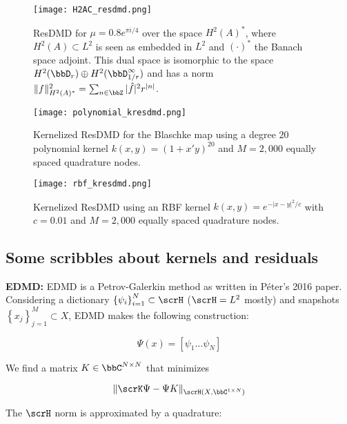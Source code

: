 \begin{figure}
    \texttt{[image: H2AC\_resdmd.png]}
    \caption{
        ResDMD for $\mu = 0.8 e^{\pi i / 4}$ over the space $H^2 (A)^*$, where 
        $H^2 (A) \subset L^2$ is seen as embedded in $L^2$ and $(\cdot)^*$ the Banach space 
        adjoint. This dual space is isomorphic to the space 
        $H^2 (\bbD_r) \oplus H^2 (\bbD_{1/r}^\infty)$ and has a norm 
        $\| f \|_{H^2 (A)^*}^2 = \sum_{n \in \bbZ} | \hat{f} |^2 r^{| n |}$. 
    }
\end{figure}

\begin{figure}
    \texttt{[image: polynomial\_kresdmd.png]}
    \caption{
        Kernelized ResDMD for the Blaschke map using a degree $20$ polynomial kernel 
        $k(x,y) = (1 + x'y)^{20}$ 
        and $M = 2,000$ equally spaced quadrature nodes. 
    }
    \label{fig:poly}
\end{figure}

\begin{figure}
    \texttt{[image: rbf\_kresdmd.png]}
    \caption{
        Kernelized ResDMD using an RBF kernel $k(x,y) = e^{- |x - y|^2 / c}$ with 
        $c = 0.01$ and $M = 2,000$ equally spaced quadrature nodes. 
    }
    \label{fig:gauss}
\end{figure}


\subsection{Some scribbles about kernels and residuals}

\textbf{EDMD:} EDMD is a Petrov-Galerkin method as written in Péter's 2016 paper. 
Considering a dictionary $\left\{ \psi_i \right\}_{i=1}^N \subset \scrH$ ($\scrH = L^2$ 
mostly) and snapshots $\left\{ x_j \right\}_{j=1}^M \subset X$, EDMD makes the following 
construction:

\begin{equation}
    \Psi (x) = \left[ \psi_1 \ldots \psi_N \right]
\end{equation}

We find a matrix $K \in \bbC^{N \times N}$ that minimizes

\begin{equation}
    \label{L2min}
    \| \scrK \Psi - \Psi K \|_{\scrH (X, \bbC^{1 \times N})}
\end{equation}

The $\scrH$ norm is approximated by a quadrature:


